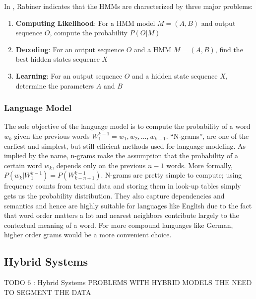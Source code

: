In \cite{rabiner1989tutorial}, Rabiner indicates that the \ac{HMM}s are charecterized by three major problems:

	\begin{enumerate}
		\item \textbf{Computing Likelihood}: For a \ac{HMM} model $M = (A,B)$ and output sequence $O$, compute the probability $P(O|M)$
		\item \textbf{Decoding}: For an output sequence $O$ and a \ac{HMM} $M=(A,B)$, find the best hidden states sequence $X$
		\item \textbf{Learning}: For an output sequence $O$ and a hidden state sequence $X$, determine the parameters $A$ and $B$
		 \cite{keselj2009speech}
	\end{enumerate}
   
   

\subsubsection{Language Model} 
\label{bg:sub5}

The sole objective of the language model is to compute the probability of a word $w_k$ given the previous words $W_1^{k-1} = w_1,w_2,...,w_{k-1}$. \enquote{N-grams}, are one of the earliest and simplest, but still efficient methods used for language modeling. As implied by the name, n-grams make the assumption that the probability of a certain word $w_k$, depends only on the previous $n-1$ words. More formally, $P(w_k|W_1^{k-1}) = P(W_{k-n+1}^{k-1}) $. N-grams are pretty simple to compute; using frequency counts from textual data and storing them in look-up tables simply gets us the probability distribution. They also capture dependencies and semantics and hence are highly suitable for languages like English due to the fact that word order matters a lot and nearest neighbors contribute largely to the contextual meaning of a word. For more compound languages like German, higher order grams would be a more convenient choice.  


\subsection{Hybrid Systems} 
\label{bg:sub7}
TODO 6 : Hybrid Systems
PROBLEMS WITH HYBRID MODELS
THE NEED TO SEGMENT THE DATA



